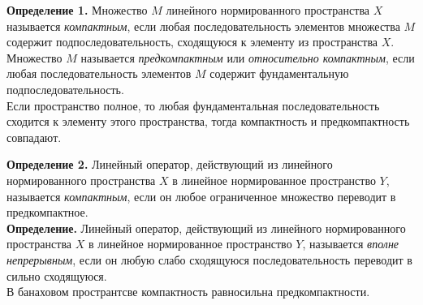 \documentclass[12pt,a4paper, titlepage]{article}
\begin{document}
\textbf{Определение 1.} Множество $M$ линейного нормированного пространства $X$ называется \textit{компактным}, если любая последовательность элементов множества $M$ содержит подпоследовательность, сходящуюся к элементу из пространства $X$.\\

Множество $M$ называется \textit{предкомпактным} или \textit{относительно компактным}, если любая последовательность элементов $M$ содержит фундаментальную подпоследовательность.\\

Если пространство полное, то любая фундаментальная последовательность сходится к элементу этого пространства, тогда компактность и предкомпактность совпадают.

\textbf{Определение 2.} Линейный оператор, действующий из линейного нормированного пространства $X$ в линейное нормированное пространство $Y$, называется \textit{компактным}, если он любое ограниченное множество переводит в предкомпактное.\\

\textbf{Определение.} Линейный оператор, действующий из линейного нормированного пространства $X$ в линейное нормированное пространство $Y$, называется \textit{вполне непрерывным}, если он любую слабо сходящуюся последовательность переводит в сильно сходящуюся.\\

В банаховом пространтсве компактность равносильна предкомпактности.

%
%
%
%
%
\end{document}
